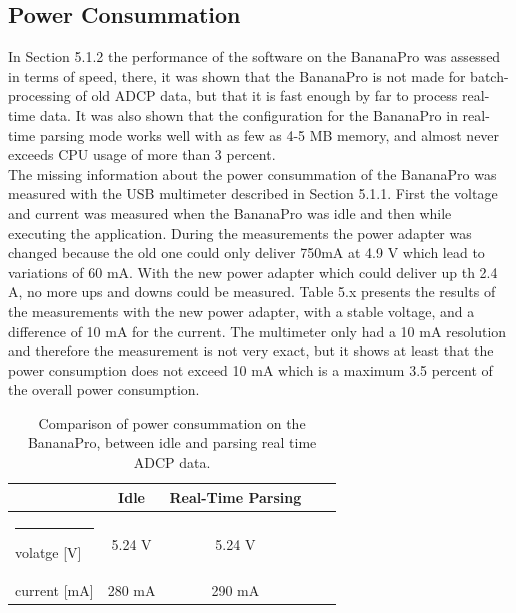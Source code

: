 \subsection{Power Consummation}
In Section 5.1.2 the performance of the software on the BananaPro was assessed in terms of speed, there, it was shown that the BananaPro is not made for batch-processing of old ADCP data, but that it is fast enough by far to process real-time data. It was also shown that the configuration for the BananaPro in real-time parsing mode works well with as few as 4-5 MB memory, and almost never exceeds CPU usage of more than 3 percent.\\ 
The missing information about the power consummation of the BananaPro was measured with the USB multimeter described in Section 5.1.1. First the voltage and current was measured when the BananaPro was idle and then while executing the application. During the measurements the power adapter was changed because the old one could only deliver 750mA at 4.9 V which lead to variations of 60 mA. With the new power adapter which could deliver up th 2.4 A, no more ups and downs could be measured. Table 5.x presents the results of the measurements with the new power adapter, with a stable voltage, and a difference of 10 mA for the current. The multimeter only had a 10 mA resolution and therefore the measurement is not very exact, but it shows at least that the power consumption does not exceed 10 mA which is a maximum 3.5 percent of the overall power consumption.

\begin{table}[h]
	\centering
	\begin{tabular}{l@{\quad}c@{\quad}c@{\quad}c@{\quad}c} \hline \rule{0pt}{8pt}
	  & Idle & Real-Time Parsing \rule{0pt}{8pt} \\\hline \rule{-2pt}{8pt}
	  volatge [V] & 5.24 V & 5.24 V\\
	  current [mA] & 280 mA& 290 mA\\ 
	  \hline
	\end{tabular}
	\caption{Comparison of power consummation on the BananaPro, between idle and parsing real time ADCP data.}
	\label{tab:energy}
\end{table}

